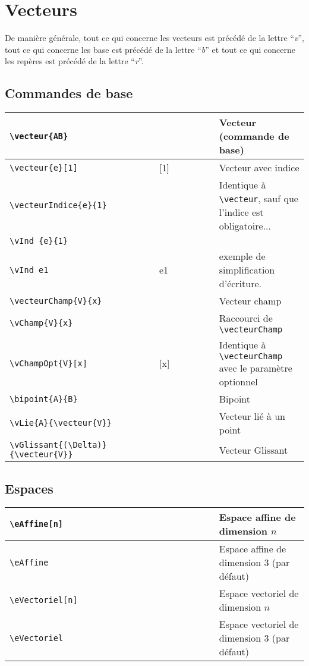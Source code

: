 \documentclass[a4paper,10pt]{article}
\begin{document}
	\section{Vecteurs}

	De manière générale, tout ce qui concerne les vecteurs est précédé de la lettre ``\emph{v}'',
	tout ce qui concerne les base est précédé de la lettre ``\emph{b}''
	et tout ce qui concerne les repères est précédé de la lettre ``\emph{r}''.


	\subsection{Commandes de base}
	\noindent
	\begin{tabular}{|p{0.5\linewidth}|p{0.2\linewidth}|p{0.3\linewidth}|}
		\hline
			\verb!\vecteur{AB}!		&	\vecteur{AB}		&	Vecteur (commande de base)
		\\\hline
			\verb!\vecteur{e}[1]!		&	\vecteur{e}[1]		&	Vecteur avec indice
		\\\hline
			\verb!\vecteurIndice{e}{1}!	&	\vecteurIndice{e}{1}	&	Identique à \verb!\vecteur!, sauf que l'indice est obligatoire...
		\\\hline
			\verb!\vInd {e}{1}!		&	\vecteurIndice{e}{1}	&	
		\\\hline
			\verb!\vInd e1!			&	\vInd e1		&	exemple de simplification d'écriture.
		\\\hline
			\verb!\vecteurChamp{V}{x}!	&	\vecteurChamp{V}{x}	&	Vecteur champ
		\\\hline
			\verb!\vChamp{V}{x}!		&	\vChamp{V}{x}		&	Raccourci de \verb!\vecteurChamp!
		\\\hline
			\verb!\vChampOpt{V}[x]!		&	\vChampOpt{V}[x]	&	Identique à \verb!\vecteurChamp! avec le paramètre optionnel
		\\\hline
			\verb!\bipoint{A}{B}!		&	\bipoint{A}{B}		&	Bipoint
		\\\hline
			\verb!\vLie{A}{\vecteur{V}}!	&	\vLie{A}{\vecteur{V}}	&	Vecteur lié à un point 
		\\\hline
			\verb!\vGlissant{(\Delta)}{\vecteur{V}}!&\vGlissant{(\Delta)}{\vecteur{V}}	&	Vecteur Glissant
		\\\hline
	\end{tabular}


	\subsection{Espaces}
	\noindent
	\begin{tabular}{|p{0.5\linewidth}|p{0.2\linewidth}|p{0.3\linewidth}|}
		\hline
			\verb!\eAffine[n]!		&	\eAffine[n]		&	Espace affine de dimension $n$
		\\\hline
			\verb!\eAffine!		&	\eAffine		&	Espace affine de dimension $3$ (par défaut)
		\\\hline
			\verb!\eVectoriel[n]!		&	\eVectoriel[n]		&	Espace vectoriel de dimension $n$
		\\\hline
			\verb!\eVectoriel!		&	\eVectoriel		&	Espace vectoriel de dimension $3$ (par défaut)
		\\\hline
	\end{tabular}
\end{document}
